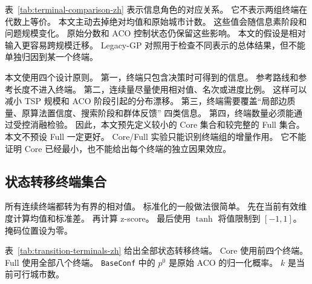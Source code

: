 \documentclass[letterpaper,journal]{IEEEtran}
\begin{document}
表~\ref{tab:terminal-comparison-zh} 表示信息角色的对应关系。
它不表示两组终端在代数上等价。
本文主动去掉绝对均值和原始城市计数。
这些值会随信息素阶段和问题规模变化。
原始分数和 ACO 控制状态仍保留这些影响。
本文的假设是相对输入更容易跨规模迁移。
Legacy-GP 对照用于检查不同表示的总体结果，但不能单独归因到某一个终端。

本文使用四个设计原则。
第一，终端只包含决策时可得到的信息。
参考路线和参考长度不进入终端。
第二，连续量尽量使用相对值、名次或进度比例。
这样可以减小 TSP 规模和 ACO 阶段引起的分布漂移。
第三，终端需要覆盖“局部边质量、原算法置信度、搜索阶段和群体反馈”
四类信息。
第四，终端数量必须能通过受控消融检验。
因此，本文预先定义较小的 Core 集合和较完整的 Full 集合。
本文不预设 Full 一定更好。
Core/Full 实验只能识别终端组的增量作用。
它不能证明 Core 已经最小，也不能给出每个终端的独立因果效应。

\subsection{状态转移终端集合}

所有连续终端都转为有界的相对值。
标准化的一般做法很简单。
先在当前有效维度计算均值和标准差。
再计算 z-score。
最后使用 \(\tanh\) 将值限制到 \([-1,1]\)。
掩码位置设为零。

表~\ref{tab:transition-terminals-zh} 给出全部状态转移终端。
Core 使用前四个终端。
Full 使用全部八个终端。
\texttt{BaseConf} 中的 \(p^0\) 是原始 ACO 的归一化概率。
\(k\) 是当前可行城市数。
\end{document}
